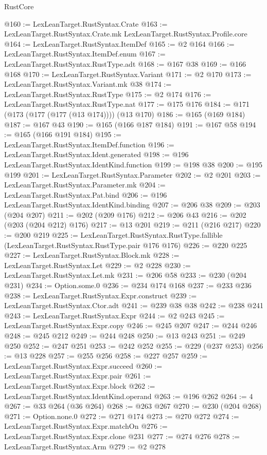 \begin{lexlean}{RustCore}
\begin{coremodule}
@160 := LexLeanTarget.RustSyntax.Crate
@163 := LexLeanTarget.RustSyntax.Crate.mk LexLeanTarget.RustSyntax.Profile.core
@164 := LexLeanTarget.RustSyntax.ItemDef
@165 := @2 @164
@166 := LexLeanTarget.RustSyntax.ItemDef.enum
@167 := LexLeanTarget.RustSyntax.RustType.adt
@168 := @167 @38
@169 := @166 @168
@170 := LexLeanTarget.RustSyntax.Variant
@171 := @2 @170
@173 := LexLeanTarget.RustSyntax.Variant.mk @38
@174 := LexLeanTarget.RustSyntax.RustType
@175 := @2 @174
@176 := LexLeanTarget.RustSyntax.RustType.nat
@177 := @175 @176
@184 := @171 (@173 (@177 (@177 (@13 @174)))) (@13 @170)
@186 := @165 (@169 @184)
@187 := @167 @43
@190 := @165 (@166 @187 @184)
@191 := @167 @58
@194 := @165 (@166 @191 @184)
@195 := LexLeanTarget.RustSyntax.ItemDef.function
@196 := LexLeanTarget.RustSyntax.Ident.generated
@198 := @196 LexLeanTarget.RustSyntax.IdentKind.function
@199 := @198 @38
@200 := @195 @199
@201 := LexLeanTarget.RustSyntax.Parameter
@202 := @2 @201
@203 := LexLeanTarget.RustSyntax.Parameter.mk
@204 := LexLeanTarget.RustSyntax.Pat.bind
@206 := @196 LexLeanTarget.RustSyntax.IdentKind.binding
@207 := @206 @38
@209 := @203 (@204 @207)
@211 := @202 (@209 @176)
@212 := @206 @43
@216 := @202 (@203 (@204 @212) @176)
@217 := @13 @201
@219 := @211 (@216 @217)
@220 := @200 @219
@225 := LexLeanTarget.RustSyntax.RustType.fallible
    (LexLeanTarget.RustSyntax.RustType.pair @176 @176)
@226 := @220 @225
@227 := LexLeanTarget.RustSyntax.Block.mk
@228 := LexLeanTarget.RustSyntax.Let
@229 := @2 @228
@230 := LexLeanTarget.RustSyntax.Let.mk
@231 := @206 @58
@233 := @230 (@204 @231)
@234 := Option.some.{0}
@236 := @234 @174 @168
@237 := @233 @236
@238 := LexLeanTarget.RustSyntax.Expr.construct
@239 := LexLeanTarget.RustSyntax.Ctor.adt
@241 := @239 @38 @38
@242 := @238 @241
@243 := LexLeanTarget.RustSyntax.Expr
@244 := @2 @243
@245 := LexLeanTarget.RustSyntax.Expr.copy
@246 := @245 @207
@247 := @244 @246
@248 := @245 @212
@249 := @244 @248
@250 := @13 @243
@251 := @249 @250
@252 := @247 @251
@253 := @242 @252
@255 := @229 (@237 @253)
@256 := @13 @228
@257 := @255 @256
@258 := @227 @257
@259 := LexLeanTarget.RustSyntax.Expr.succeed
@260 := LexLeanTarget.RustSyntax.Expr.pair
@261 := LexLeanTarget.RustSyntax.Expr.block
@262 := LexLeanTarget.RustSyntax.IdentKind.operand
@263 := @196 @262
@264 := 4
@267 := @33 @264 (@36 @264)
@268 := @263 @267
@270 := @230 (@204 @268)
@271 := Option.none.{0}
@272 := @271 @174
@273 := @270 @272
@274 := LexLeanTarget.RustSyntax.Expr.matchOn
@276 := LexLeanTarget.RustSyntax.Expr.clone @231
@277 := @274 @276
@278 := LexLeanTarget.RustSyntax.Arm
@279 := @2 @278

\end{coremodule}
\end{lexlean}
